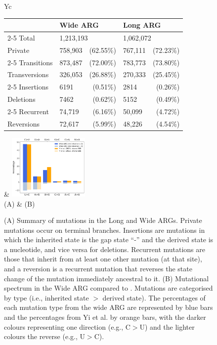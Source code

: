\documentclass{article}
\begin{document}
\begin{figure} \centering
{}
\begin{tabularx}{\textwidth}{Yc}

\begin{tabular}[b]{llrlr}\toprule
            & \multicolumn{2}{l}{Wide ARG} & \multicolumn{2}{l}{Long ARG} \\
    \cmidrule{2-5}
Total      & \multicolumn{2}{l}{1,213,193} & \multicolumn{2}{l}{1,062,072} \\
Private     & 758,903 & (62.55\%) &  767,111 & (72.23\%)\\
    \cmidrule{2-5}
Transitions & 873,487   & (72.00\%) & 783,773  & (73.80\%) \\
Transversions & 326,053 & (26.88\%) & 270,333  & (25.45\%) \\
    \cmidrule{2-5}
Insertions  & 6191  & (0.51\%) & 2814   & (0.26\%) \\
Deletions   & 7462  & (0.62\%) & 5152   & (0.49\%) \\
    \cmidrule{2-5}
Recurrent   & 74,719 & (6.16\%) & 50,099 & (4.72\%) \\
Reversions  & 72,617 & (5.99\%) & 48,226 & (4.54\%) \\
\bottomrule
\end{tabular}
&
\includegraphics[width=0.35\textwidth]{figures/mutational_spectra.pdf}\\
(A) & (B)\\
\end{tabularx}
\caption{\label{fig:mutational_spectra}
(A) Summary of mutations in the Long and Wide ARGs. Private mutations
occur on terminal branches. Insertions are mutations in which the
inherited state is the gap state ``-'' and the derived state is a
nucleotide, and vice versa for deletions. Recurrent mutations are
those that inherit from at least one other mutation (at that site),
and a reversion is a recurrent mutation that reverses the state change
of the mutation immediately ancestral to it.
(B) Mutational spectrum in
the Wide ARG compared to \cite{Yi2021-sc}. Mutations are
categorised by type (i.e., inherited state $>$ derived state). The percentages
of each mutation type from the wide ARG are represented by blue bars and the
percentages from Yi et al. by orange bars, with the darker colours representing
one direction (e.g., C$>$U) and the lighter colours the reverse (e.g., U$>$C).}
\end{figure}
\end{document}

